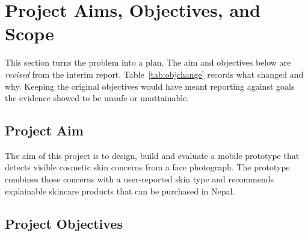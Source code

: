 \section{Project Aims, Objectives, and Scope}
\label{sec:aims}

This section turns the problem into a plan. The aim and objectives below are \emph{revised} from the interim report. Table~\ref{tab:objchange} records what changed and why. Keeping the original objectives would have meant reporting against goals the evidence showed to be unsafe or unattainable.

\subsection{Project Aim}

The aim of this project is to design, build and evaluate a mobile prototype that detects visible cosmetic skin concerns from a face photograph. The prototype combines those concerns with a user-reported skin type and recommends explainable skincare products that can be purchased in Nepal.

\subsection{Project Objectives}

